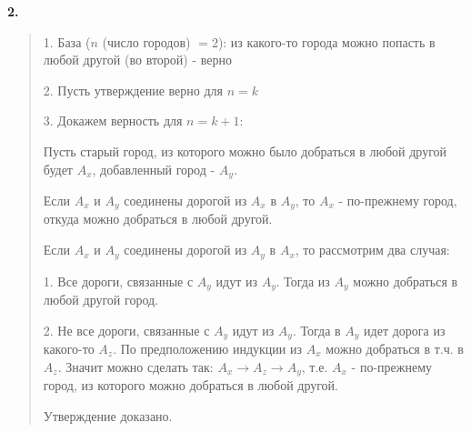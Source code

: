 \documentclass{article}
\begin{document}
\textsf{\textbf{2.}}
\begin{quote}

1. База ($n$ (число городов) $=2$): из какого-то города можно попасть в любой другой (во второй) - верно

2. Пусть утверждение верно для $n=k$

3. Докажем верность для $n = k + 1$:

Пусть старый город, из которого можно было добраться в любой другой будет $A_x$, добавленный город - $A_y$.

Если $A_x$ и $A_y$ соединены дорогой из $A_x$ в $A_y$, то $A_x$ - по-прежнему город, откуда можно добраться в любой другой.

Если $A_x$ и $A_y$ соединены дорогой из $A_y$ в $A_x$, то рассмотрим два случая:

1. Все дороги, связанные с $A_y$ идут из $A_y$. Тогда из $A_y$ можно добраться в любой другой город.

2. Не все дороги, связанные с $A_y$ идут из $A_y$. Тогда в $A_y$ идет дорога из какого-то $A_z$. По предположению индукции из $A_x$ можно добраться в т.ч. в $A_z$. Значит можно сделать так: $A_x \rightarrow A_z \rightarrow A_y$, т.е. $A_x$ - по-прежнему город, из которого можно добраться в любой другой.

Утверждение доказано.
\end{quote}
\end{document}
